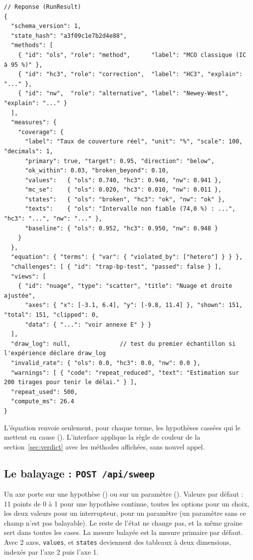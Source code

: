 \documentclass[11pt,a4paper]{article}
\begin{document}
\begin{appendices}
\begin{lstlisting}[caption={Requête et réponse de \texttt{POST /api/run}.}]
// Reponse (RunResult)
{
  "schema_version": 1,
  "state_hash": "a3f09c1e7b2d4e88",
  "methods": [
    { "id": "ols", "role": "method",      "label": "MCO classique (IC à 95 %)" },
    { "id": "hc3", "role": "correction",  "label": "HC3", "explain": "..." },
    { "id": "nw",  "role": "alternative", "label": "Newey-West", "explain": "..." }
  ],
  "measures": {
    "coverage": {
      "label": "Taux de couverture réel", "unit": "%", "scale": 100, "decimals": 1,
      "primary": true, "target": 0.95, "direction": "below",
      "ok_within": 0.03, "broken_beyond": 0.10,
      "values":   { "ols": 0.740, "hc3": 0.946, "nw": 0.941 },
      "mc_se":    { "ols": 0.020, "hc3": 0.010, "nw": 0.011 },
      "states":   { "ols": "broken", "hc3": "ok", "nw": "ok" },
      "texts":    { "ols": "Intervalle non fiable (74,0 %) : ...", "hc3": "...", "nw": "..." },
      "baseline": { "ols": 0.952, "hc3": 0.950, "nw": 0.948 }
    }
  },
  "equation": { "terms": { "var": { "violated_by": ["hetero"] } } },
  "challenges": [ { "id": "trap-bp-test", "passed": false } ],
  "views": [
    { "id": "nuage", "type": "scatter", "title": "Nuage et droite ajustée",
      "axes": { "x": [-3.1, 6.4], "y": [-9.8, 11.4] }, "shown": 151, "total": 151, "clipped": 0,
      "data": { "...": "voir annexe E" } }
  ],
  "draw_log": null,              // test du premier échantillon si l'expérience déclare draw_log
  "invalid_rate": { "ols": 0.0, "hc3": 0.0, "nw": 0.0 },
  "warnings": [ { "code": "repeat_reduced", "text": "Estimation sur 200 tirages pour tenir le délai." } ],
  "repeat_used": 500,
  "compute_ms": 26.4
}
\end{lstlisting}

L'équation renvoie seulement, pour chaque terme, les hypothèses cassées qui le mettent en cause (). L'interface applique la règle de couleur de la section~\ref{sec:verdict} avec les méthodes affichées, sans nouvel appel.

\subsection{Le balayage : \texttt{POST /api/sweep}}
Un axe porte sur une hypothèse () ou sur un paramètre (). Valeurs par défaut : 11 points de 0 à 1 pour une hypothèse continue, toutes les options pour un choix, les deux valeurs pour un interrupteur,  pour un paramètre (un paramètre sans ce champ n'est pas balayable). Le reste de l'état ne change pas, et la même graine sert dans toutes les cases. La mesure balayée est la mesure primaire par défaut. Avec 2 axes, \texttt{values},  et \texttt{states} deviennent des tableaux à deux dimensions, indexés par l'axe 2 puis l'axe 1.


\end{appendices}
\end{document}
